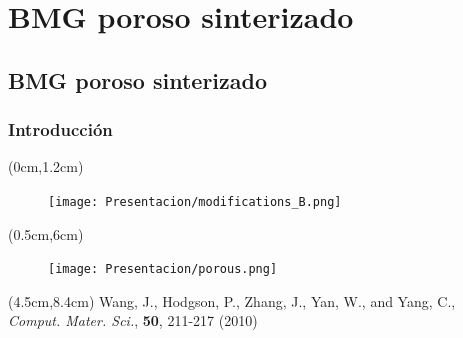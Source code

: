 
\section[BMG poroso]{BMG poroso sinterizado}
\subsection{BMG poroso sinterizado}

\begin{frame}
    \frametitle{Introducci\'on}
    \begin{textblock*}{12.6cm}(0cm,1.2cm)
    \begin{figure}
    \centering
    \texttt{[image: Presentacion/modifications\_B.png]}
    \end{figure}
  \end{textblock*}
    \begin{textblock*}{4cm}(0.5cm,6cm)
      \begin{figure}
      \centering
      \texttt{[image: Presentacion/porous.png]}
      \end{figure}
    \end{textblock*}
    \begin{textblock*}{7.2cm}(4.5cm,8.4cm)
      \scriptsize{Wang, J., Hodgson, P., Zhang, J., Yan, W., and Yang, C., \textit{Comput. Mater. Sci.}, \textbf{50}, 211-217 (2010)}
    \end{textblock*}
\end{frame}

